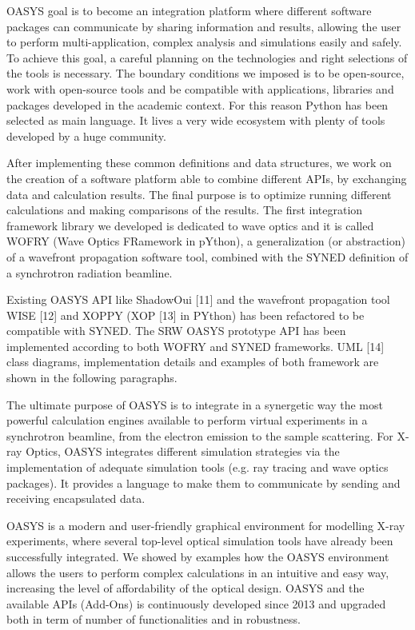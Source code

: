 \documentclass{aip-cp}
\begin{document}
OASYS goal is to become an integration platform where different software packages can communicate by sharing information and results, allowing the user to perform multi-application, complex analysis and simulations easily and safely. To achieve this goal, a careful planning on the technologies and right selections of the tools is necessary. The boundary conditions we imposed is to be open-source, work with open-source tools and be compatible with applications, libraries and packages developed in the academic context. For this reason Python has been selected as main language. It lives a very wide ecosystem with plenty of tools developed by a huge community. 





After implementing these common definitions and data structures, we work on the creation of a software platform able to combine different APIs, by exchanging data and calculation results. The final purpose is to optimize running different calculations and making comparisons of the results. The first integration framework library we developed is dedicated to wave optics and it is called WOFRY (Wave Optics FRamework in pYthon), a generalization (or abstraction) of a wavefront propagation software tool, combined with the SYNED definition of a synchrotron radiation beamline.








Existing OASYS API like ShadowOui [11] and the wavefront propagation tool WISE [12] and XOPPY (XOP [13] in PYthon) has been refactored to be compatible with SYNED. The SRW OASYS prototype API has been implemented according to both WOFRY and SYNED frameworks. UML [14] class diagrams, implementation details and examples of both framework are shown in the following paragraphs.

The ultimate purpose of OASYS is to integrate in a synergetic way the most powerful calculation engines available to perform virtual experiments in a synchrotron beamline, from the electron emission to the sample scattering. For X-ray Optics, OASYS integrates different simulation strategies via the implementation of adequate simulation tools (e.g. ray tracing and wave optics packages). It provides a language to make them to communicate by sending and receiving encapsulated data.

OASYS is a modern and user-friendly graphical environment for modelling X-ray experiments, where several top-level optical simulation tools have already been successfully integrated. We showed by examples how the OASYS environment allows the users to perform complex calculations in an intuitive and easy way, increasing the level of affordability of the optical design. OASYS and the available APIs (Add-Ons) is continuously developed since 2013 and upgraded both in term of number of functionalities and in robustness.
\end{document}
